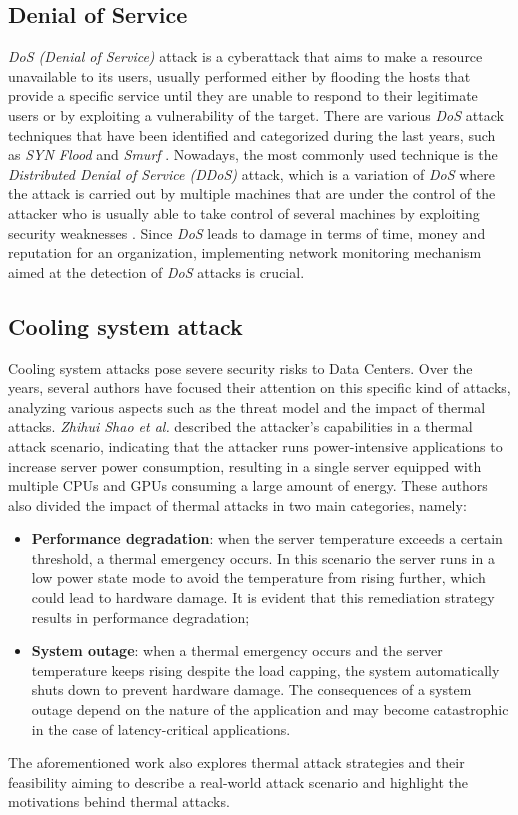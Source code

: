 \subsection{Denial of Service}
\emph{DoS (Denial of Service)} attack is a cyberattack that aims to make a resource unavailable to its users, usually performed either by flooding the hosts that provide a specific service until they are unable to respond to their legitimate users or by exploiting a vulnerability of the target. There are various \emph{DoS} attack techniques that have been identified and categorized during the last years, such as \emph{SYN Flood} and \emph{Smurf} \cite{understandingdos}. Nowadays, the most commonly used technique is the \emph{Distributed Denial of Service (DDoS)} attack, which is a variation of \emph{DoS} where the attack is carried out by multiple machines that are under the control of the attacker who is usually able to take control of several machines by exploiting security weaknesses \cite{understandingdos}. Since \emph{DoS} leads to damage in terms of time, money and reputation for an organization, implementing network monitoring mechanism aimed at the detection of \emph{DoS} attacks is crucial.
\subsection{Cooling system attack}
Cooling system attacks pose severe security risks to Data Centers. Over the years, several authors have focused their attention on this specific kind of attacks, analyzing various aspects such as the threat model and the impact of thermal attacks. \emph{Zhihui Shao et al.} \cite{hiddenthreatthermalattacks} described the attacker's capabilities in a thermal attack scenario, indicating that the attacker runs power-intensive applications to increase server power consumption, resulting in a single server equipped with multiple CPUs and GPUs consuming a large amount of energy. These authors also divided the impact of thermal attacks in two main categories, namely:
\begin{itemize}
    \item \textbf{Performance degradation}: when the server temperature exceeds a certain threshold, a thermal emergency occurs. In this scenario the server runs in a low power state mode to avoid the temperature from rising further, which could lead to hardware damage. It is evident that this remediation strategy results in performance degradation; 
    \item \textbf{System outage}: when a thermal emergency occurs and the server temperature keeps rising despite the load capping, the system automatically shuts down to prevent hardware damage. The consequences of a system outage depend on the nature of the application and may become catastrophic in the case of latency-critical applications.
\end{itemize}
The aforementioned work also explores thermal attack strategies and their feasibility aiming to describe a real-world attack scenario and highlight the motivations behind thermal attacks. 

